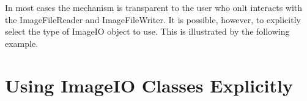 In most cases the mechanism is transparent to the user who onlt interacts
with the ImageFileReader and ImageFileWriter. It is
possible, however, to explicitly select the type of ImageIO object
to use.  This is illustrated by the following example.


\section{Using ImageIO Classes Explicitly}
\label{sec:ImageReadExportVTK}




